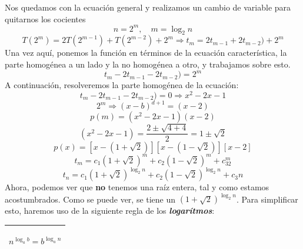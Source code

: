 \documentclass[10pt,a4paper,spanish]{report}
\theoremstyle{definition}
\theoremstyle{remark}
\begin{document}
\begin{center}
    Nos quedamos con la ecuación general y realizamos un cambio de variable para quitarnos los cocientes $$n = 2^{m}, \quad m = \log_2n$$
    $$T(2^m)=2T(2^{m-1})+T(2^{m-2})+2^m \Longrightarrow t_m=2t_{m-1}+2t_{m-2})+2^m$$
    Una vez aquí, ponemos la función en términos de la ecuación característica, la parte homogénea a un lado y la no homogénea a otro, y trabajamos sobre esto.
    $$t_m-2t_{m-1}-2t_{m-2})=2^m$$
    A continuación, resolveremos la parte homogénea de la ecuación:
    $$t_m-2t_{m-1}-2t_{m-2}) = 0 \Longrightarrow x^2 -2x -1$$
    $$2^m \Longrightarrow (x-b)^{d+1}=(x-2)$$
    $$p(m)=(x^2 - 2x -1)(x-2)$$
    $$(x^2 - 2x -1)=\frac{2 \pm \sqrt{4+4}}{2} = 1 \pm \sqrt{2}$$
    $$p(x)=\left[x-(1+\sqrt{2})\right]\left[x-(1-\sqrt{2})\right]\left[x-2\right]$$
    $$t_m = c_1(1+\sqrt{2})^m + c_2(1-\sqrt{2})^m+c_32^m$$
    $$t_n = c_1(1+\sqrt{2})^{\log_2n} + c_2(1-\sqrt{2})^{\log_2n}+c_3n$$
    Ahora, podemos ver que \textbf{no} tenemos una raíz entera, tal y como estamos acostumbrados. Como se puede ver, se tiene un $(1+\sqrt{2})^{\log_2n}$. Para simplificar esto, haremos uso de la siguiente regla de los \textbf{\textit{logarítmos}}:\\

    \begin{tabular}{|p{4cm}|}
    \hline\begin{center}
        \Large{$n^{\log_ab}=b^{\log_an}$}
    \end{center}\\
    \hline
    \end{tabular}


\end{center}
\end{document}
